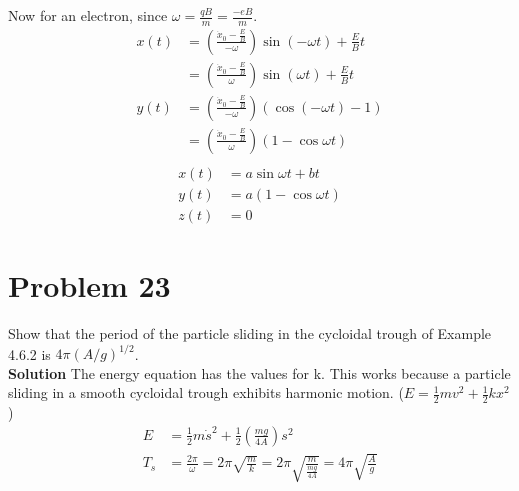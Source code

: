 \documentclass[]{article}
\newcommand{\bd}{\textbf}
\begin{document}
	Now for an electron, since $ \omega = \frac{qB}{m} = \frac{-eB}{m} $. \\
	\begin{equation}
		\begin{split}
			x(t) &= \left( \frac{\dot{x}_0 - \frac{E}{B}}{-\omega} \right) \sin (-\omega t) + \frac{E}{B}t \\ 
			&= \left( \frac{\dot{x}_0 - \frac{E}{B}}{\omega} \right) \sin (\omega t) + \frac{E}{B}t \\
			y(t) &= \left( \frac{\dot{x}_0 - \frac{E}{B}}{-\omega} \right) (\cos (-\omega t) - 1) \\
			&= \left( \frac{\dot{x}_0 - \frac{E}{B}}{\omega} \right) (1 - \cos \omega t) \\
		\end{split}
	\end{equation}
	\begin{equation}
		\begin{split}
			x(t) &= a\sin \omega t + bt \\
			y(t) &= a (1 - \cos \omega t) \\
			z(t) &= 0
		\end{split}
	\end{equation}
	\section{Problem 23}
	
	Show that the period of the particle sliding in the cycloidal trough of Example 4.6.2 is $ 4 \pi (A/g)^{1/2} $. \\
	
	\bd{Solution} The energy equation has the values for k. This works because a particle sliding in a smooth cycloidal trough exhibits harmonic motion.  ($ E = \frac{1}{2}mv^2 + \frac{1}{2}kx^2 $)
	\begin{equation}
		\begin{split}
			E &= \frac{1}{2}m\dot{s}^2 + \frac{1}{2}\left( \frac{mg}{4A} \right)s^2 \\
			T_s &= \frac{2\pi}{\omega} =  2\pi \sqrt{\frac{m}{k}} = 2\pi \sqrt{\frac{m}{\frac{mg}{4A}}} = 4\pi \sqrt{\frac{A}{g}} \\
		\end{split}
	\end{equation}
\end{document}
